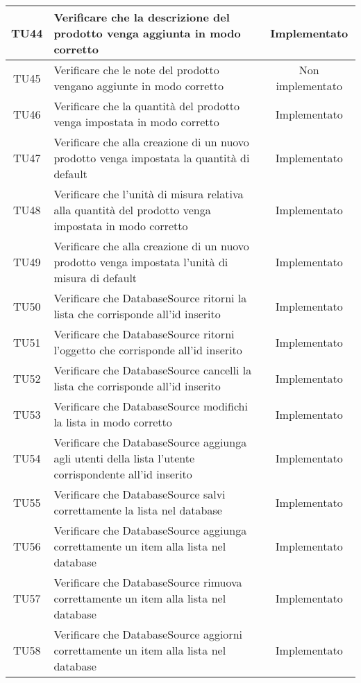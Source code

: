 \begin{center}
\begin{longtable}{|c|>{\centering}m{10cm}|c|}
		TU44 & Verificare che la descrizione del prodotto venga aggiunta in modo corretto & Implementato \\ \hline
		TU45 & Verificare che le note del prodotto vengano aggiunte in modo corretto & Non implementato \\ \hline
		TU46 & Verificare che la quantità del prodotto venga impostata in modo corretto & Implementato \\ \hline
		TU47 & Verificare che alla creazione di un nuovo prodotto venga impostata la quantità di default & Implementato \\ \hline
		TU48 & Verificare che l'unità di misura relativa alla quantità del prodotto venga impostata in modo corretto & Implementato \\ \hline
		TU49 & Verificare che alla creazione di un nuovo prodotto venga impostata l'unità di misura di default & Implementato \\ \hline
		TU50 & Verificare che DatabaseSource ritorni la lista che corrisponde all'id inserito & Implementato \\ \hline
		TU51 & Verificare che DatabaseSource ritorni l'oggetto che corrisponde all'id inserito & Implementato \\ \hline
		TU52 & Verificare che DatabaseSource cancelli la lista che corrisponde all'id inserito & Implementato \\ \hline
		TU53 & Verificare che DatabaseSource modifichi la lista in modo corretto & Implementato \\ \hline
		TU54 & Verificare che DatabaseSource aggiunga agli utenti della lista l'utente corrispondente all'id inserito & Implementato \\ \hline
		TU55 & Verificare che DatabaseSource salvi correttamente la lista nel database & Implementato \\ \hline
		TU56 & Verificare che DatabaseSource aggiunga correttamente un item alla lista nel database & Implementato \\ \hline
		TU57 & Verificare che DatabaseSource rimuova correttamente un item alla lista nel database & Implementato \\ \hline
		TU58 & Verificare che DatabaseSource aggiorni correttamente un item alla lista nel database & Implementato \\ \hline
	\end{longtable}
\end{center}
